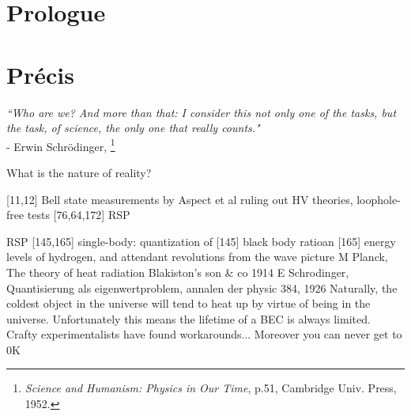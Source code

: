 \section*{Prologue}\label{sec:prologue}


\section*{Pr\'{e}cis}\label{sec:abstract}

\begin{adjustwidth}{6cm}{0cm}
\begin{flushright}
\emph{``Who are we? And more than that: I consider this not only one of the tasks, but the task, of science, the only one that really counts."\\}
- Erwin Schr\"{o}dinger, \footnote{\emph{Science and Humanism: Physics in Our Time}, p.51, Cambridge Univ. Press, 1952.}\\
\end{flushright}
\end{adjustwidth}


What is the nature of reality?



[11,12] Bell state measurements by Aspect et al ruling out HV theories, loophole-free tests [76,64,172] RSP


RSP [145,165] single-body: quantization of [145] black body ratioan [165] energy levels of hydrogen, and attendant revolutions from the wave picture  
		M Planck, The theory of heat radiation Blakiston's son \& co 1914
		E Schrodinger, Quantisierung als eigenwertproblem, annalen der physic 384, 1926
Naturally, the coldest object in the universe will tend to heat up by virtue of being in the universe. Unfortunately this means the lifetime of a BEC is always limited. Crafty experimentalists have found workarounds...
Moreover you can never get to 0K


